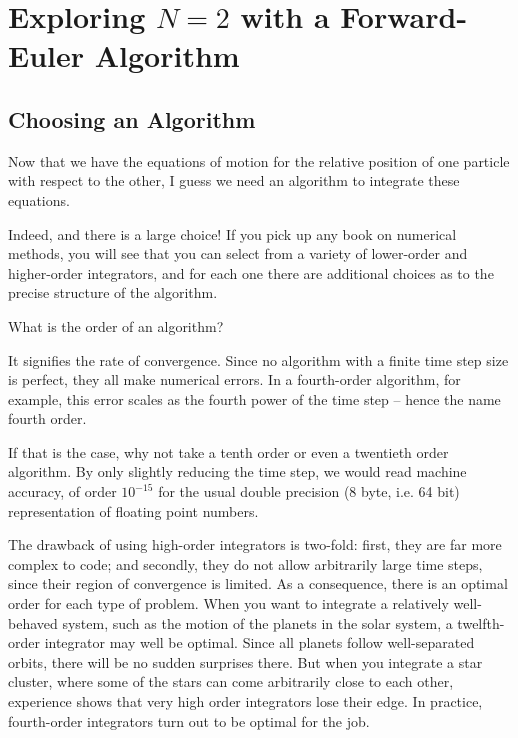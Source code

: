\chapter{Exploring $N = 2$ with a Forward-Euler Algorithm}

\section{Choosing an Algorithm}

\abc

\carol
Now that we have the equations of motion for the relative position of
one particle with respect to the other, I guess we need an algorithm
to integrate these equations.

\alice
Indeed, and there is a large choice!  If you pick up any book on
numerical methods, you will see that you can select from a variety of
lower-order and higher-order integrators, and for each one there are
additional choices as to the precise structure of the algorithm.

\bob
What is the order of an algorithm?

\alice
It signifies the rate of convergence.  Since no algorithm with a
finite time step size is perfect, they all make numerical errors.
In a fourth-order algorithm, for example, this error scales as the
fourth power of the time step -- hence the name fourth order.

\carol
If that is the case, why not take a tenth order or even a twentieth
order algorithm.  By only slightly reducing the time step, we would
read machine accuracy, of order $10^{-15}$ for the usual double
precision (8 byte, i.e. 64 bit) representation of floating point numbers.

\alice
The drawback of using high-order integrators is two-fold: first, they
are far more complex to code; and secondly, they do not allow arbitrarily
large time steps, since their region of convergence is limited.  As a
consequence, there is an optimal order for each type of problem.  When
you want to integrate a relatively well-behaved system, such as the
motion of the planets in the solar system, a twelfth-order integrator
may well be optimal.  Since all planets follow well-separated orbits,
there will be no sudden surprises there.  But when you integrate a
star cluster, where some of the stars can come arbitrarily close to each
other, experience shows that very high order integrators lose their edge.
In practice, fourth-order integrators turn out to be optimal for the job.

